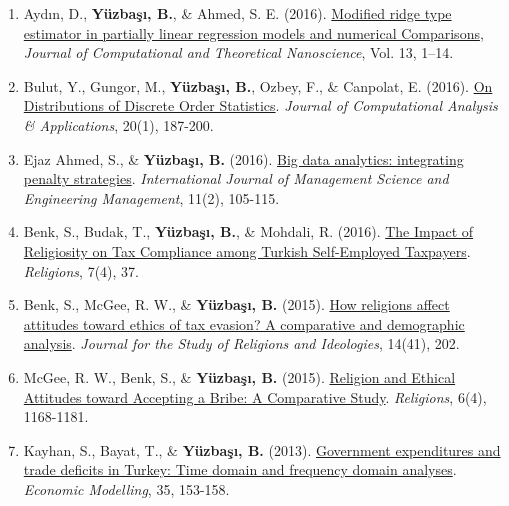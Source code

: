 \documentclass[10pt,letterpaper]{article}
\newenvironment{etaremune}{\begin{enumerate}}{\end{enumerate}}
\newcommand{\JournalInfo}[2]{\hspace{0.3em}{\small\textsf{[#1; #2]}}}
\begin{document}
\begin{etaremune}
\item Ayd\i n, D., {\bf Y\"{u}zba\c{s}{\i}, B.}, \& Ahmed, S. E. (2016). 
\href{http://www.ingentaconnect.com/contentone/asp/jctn/2016/00000013/00000010/art00087?crawler=true&mimetype=application/pdf}{Modified ridge type estimator in partially linear regression models and numerical Comparisons}, 
\emph{Journal of Computational and Theoretical Nanoscience}, Vol. 13, 1--14. 




\item Bulut, Y., Gungor, M., {\bf Y\"{u}zba\c{s}{\i}, B.}, Ozbey, F., \& Canpolat, E. (2016). 
\href{http://www.eudoxuspress.com/images/VOLUME-20-JOCAAA-2016-ISSUE-1.pdf}
{On Distributions of Discrete Order Statistics}. 
\emph{Journal of Computational Analysis \& Applications}, 20(1), 187-200. \JournalInfo{SCIE}{Q4}

\item Ejaz Ahmed, S., \& {\bf Y\"{u}zba\c{s}{\i}, B.} (2016). 
\href{http://www.tandfonline.com/doi/abs/10.1080/17509653.2016.1153252}{Big data analytics: integrating penalty strategies}. 
\emph{International Journal of Management Science and Engineering Management}, 11(2), 105-115.



\item Benk, S., Budak, T., {\bf Y\"{u}zba\c{s}{\i}, B.}, \& Mohdali, R. (2016). 
\href{http://www.mdpi.com/2077-1444/7/4/37}{The Impact of Religiosity on Tax Compliance among Turkish Self-Employed Taxpayers}. 
\emph{Religions}, 7(4), 37. \JournalInfo{AHCI}{Q1}
 \label{by2016b}
 


\item Benk, S., McGee, R. W., \& {\bf Y\"{u}zba\c{s}{\i}, B.} (2015). 
\href{http://jsri.ro/ojs/index.php/jsri/article/view/777}
{How religions affect attitudes toward ethics of tax evasion? A comparative and demographic analysis}. 
\emph{Journal for the Study of Religions and Ideologies}, 14(41), 202. \JournalInfo{AHCI}{Q1}
 \label{by2015a}
	
\item McGee, R. W., Benk, S., \& {\bf Y\"{u}zba\c{s}{\i}, B.} (2015). 
\href{http://www.mdpi.com/2077-1444/6/4/1168}{Religion and Ethical Attitudes toward Accepting a Bribe: A Comparative Study}. 
\emph{Religions}, 6(4), 1168-1181. \JournalInfo{AHCI}{Q1}
\label{by2015b}

\item Kayhan, S., Bayat, T., \& {\bf Y\"{u}zba\c{s}{\i}, B.} (2013). 
\href{http://www.sciencedirect.com/science/article/pii/S026499931300240X}
{Government expenditures and trade deficits in Turkey: Time domain and frequency domain analyses}. 
\emph{Economic Modelling}, 35, 153-158. \JournalInfo{SSCI}{Q1}


\end{etaremune}
\end{document}
